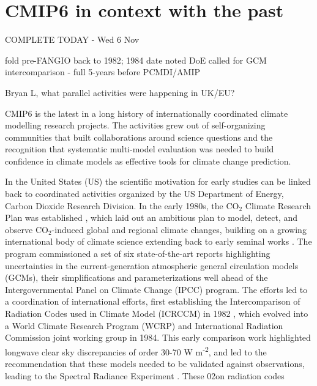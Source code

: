 \documentclass[gmd, preprint]{copernicus}
\newcommand{\mycomment}[1]{}
\def\cred#1{{\color{red}#1}}
\def\cblue#1{{\color{blue}#1}}
\begin{document}
\mycomment{
Mention CMIP6 Community MIPs - mentioned in CMIP5 section.
Durack+Tayloretal_CMIP6POverview_GMD-CMIP6SpecialIssue
https://docs.google.com/document/d/1Bxu2djLsB0blUUjr4qtwNpZWqMFXkTQRY8kOR_EJvlA/edit?skip_itp2_check=true&pli=1
}


\section{CMIP6 in context with the past}
\label{sec:cmip6InContext}
\cblue{COMPLETE TODAY - Wed 6 Nov}

\cred{fold pre-FANGIO back to 1982; 1984 date noted DoE called for GCM intercomparison - full 5-years before PCMDI/AMIP \citep{ellingson_atmospheric_2016}}

\cred{Bryan L, what parallel activities were happening in UK/EU?}

CMIP6 is the latest in a long history of internationally coordinated climate modelling research projects. The activities grew out of self-organizing communities that built collaborations around science questions and the recognition that systematic multi-model evaluation was needed to build confidence in climate models as effective tools for climate change prediction.

In the United States (US) the scientific motivation for early studies can be linked back to coordinated activities organized by the US Department of Energy, Carbon Dioxide Research Division. In the early 1980s, the CO$_{2}$ Climate Research Plan was established \citep{riches_co2_1983}, which laid out an ambitious plan to model, detect, and observe CO$_{2}$-induced global and regional climate changes, building on a growing international body of climate science extending back to early seminal works \citep[e.g.,][]{arrhenius_xxxi_1896,chamberlin_attempt_1899}. The program commissioned a set of six state-of-the-art reports \citep[e.g.,][]{maccracken_projecting_1985} highlighting uncertainties in the current-generation atmospheric general circulation models (GCMs), their simplifications and parameterizations well ahead of the Intergovernmental Panel on Climate Change (IPCC) program. The efforts led to a coordination of international efforts, first establishing the Intercomparison of Radiation Codes used in Climate Model (ICRCCM) in 1982 \citep{luther_intercomparison_1988,ellingson_intercomparison_1991}, which evolved into a World Climate Research Program (WCRP) and International Radiation Commission joint working group in 1984. This early comparison work highlighted longwave clear sky discrepancies of order 30-70 W m\textsuperscript{-2}, and led to the recommendation that these models needed to be validated against observations, leading to the Spectral Radiance Experiment \citep[SPECTRE][]{maccracken_projecting_1985}. These 02on radiation codes
\end{document}
